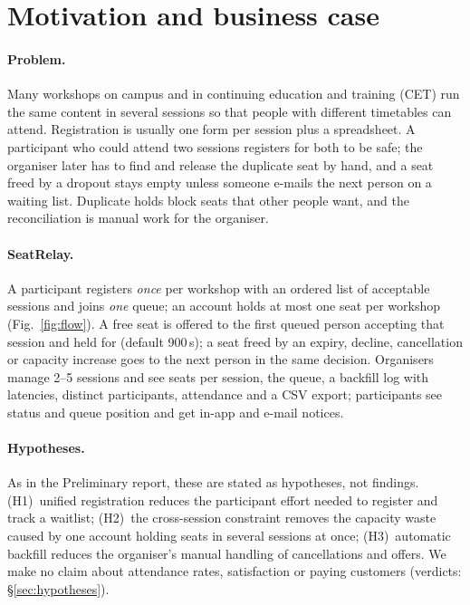 \section{Motivation and business case}\label{sec:motivation}

\paragraph{Problem.}
Many workshops on campus and in continuing education and training (CET) run the same content in
several sessions so that people with different timetables can attend. Registration is usually one
form per session plus a spreadsheet. A participant who could attend two sessions registers for
both to be safe; the organiser later has to find and release the duplicate seat by hand, and a seat
freed by a dropout stays empty unless someone e-mails the next person on a waiting list. Duplicate
holds block seats that other people want, and the reconciliation is manual work for the organiser.

\paragraph{SeatRelay.}
A participant registers \emph{once} per workshop with an ordered list of acceptable sessions and
joins \emph{one} queue; an account holds at most one seat per workshop (Fig.~\ref{fig:flow}). A free
seat is offered to the first queued person accepting that session and held for 
(default 900\,s); a seat freed by an expiry, decline, cancellation or capacity increase goes to the
next person in the same decision. Organisers manage 2--5 sessions and see seats per session, the
queue, a backfill log with latencies, distinct participants, attendance and a CSV export;
participants see status and queue position and get in-app and e-mail notices.

\paragraph{Hypotheses.}
As in the Preliminary report, these are stated as hypotheses, not findings. (H1)~unified
registration reduces the participant effort needed to register and track a waitlist; (H2)~the
cross-session constraint removes the capacity waste caused by one account holding seats in several
sessions at once; (H3)~automatic backfill reduces the organiser's manual handling of cancellations
and offers. We make no claim about attendance rates, satisfaction or paying customers
(verdicts: \S\ref{sec:hypotheses}).

